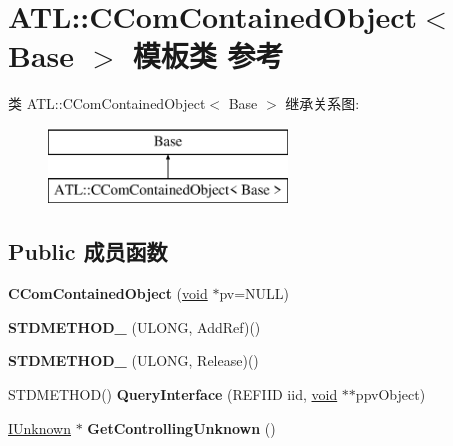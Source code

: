 \hypertarget{class_a_t_l_1_1_c_com_contained_object}{}\section{A\+TL\+:\+:C\+Com\+Contained\+Object$<$ Base $>$ 模板类 参考}
\label{class_a_t_l_1_1_c_com_contained_object}
类 A\+TL\+:\+:C\+Com\+Contained\+Object$<$ Base $>$ 继承关系图\+:\begin{figure}[H]
\begin{center}
\leavevmode
\includegraphics[height=2.000000cm]{class_a_t_l_1_1_c_com_contained_object}
\end{center}
\end{figure}
\subsection*{Public 成员函数}
\begin{DoxyCompactItemize}
\item 
\mbox{\label{class_a_t_l_1_1_c_com_contained_object_a6caba90268e698a4b37fa68a76059cb9}} 
{\bfseries C\+Com\+Contained\+Object} (\hyperlink{interfacevoid}{void} $\ast$pv=N\+U\+LL)
\item 
\mbox{\label{class_a_t_l_1_1_c_com_contained_object_a82518e2cf357d76750fd5476192e37ca}} 
{\bfseries S\+T\+D\+M\+E\+T\+H\+O\+D\+\_\+} (U\+L\+O\+NG, Add\+Ref)()
\item 
\mbox{\label{class_a_t_l_1_1_c_com_contained_object_afcb8614a6eea6bde37cf3ecd923e18bd}} 
{\bfseries S\+T\+D\+M\+E\+T\+H\+O\+D\+\_\+} (U\+L\+O\+NG, Release)()
\item 
\mbox{\label{class_a_t_l_1_1_c_com_contained_object_a7316a9aadc32dba0821e17027686081f}} 
S\+T\+D\+M\+E\+T\+H\+OD() {\bfseries Query\+Interface} (R\+E\+F\+I\+ID iid, \hyperlink{interfacevoid}{void} $\ast$$\ast$ppv\+Object)
\item 
\mbox{\label{class_a_t_l_1_1_c_com_contained_object_ac08e79cca4b70328972cc47382ccc1f9}} 
\hyperlink{interface_i_unknown}{I\+Unknown} $\ast$ {\bfseries Get\+Controlling\+Unknown} ()
\end{DoxyCompactItemize}
